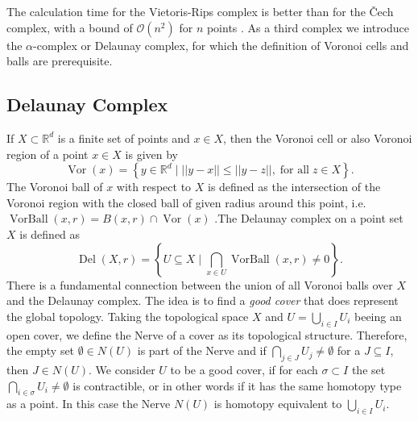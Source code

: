 \documentclass[runningheads]{llncs}
\DeclareMathOperator{\VorBall}{\text{VorBall}}
\DeclareMathOperator{\Vor}{\text{Vor}}
\DeclareMathOperator{\Del}{\text{Del}}
\begin{document}
The calculation time for the Vietoris-Rips complex is better than for the \v{C}ech complex, with a bound of $\mathcal{O}(n^2)$ for $n$ points \cite{Zomorodian10}. As a third complex we introduce the $\alpha$-complex or Delaunay complex, for which the definition of Voronoi cells and balls are prerequisite.


\subsection{Delaunay Complex}
If $X \subset \mathbb{R}^d$ is a finite set of points and $x \in X$, then the Voronoi cell or also Voronoi region of a point $x \in X$ is given by
\begin{equation}
\label{voronoicell}
\Vor(x) = \left\{ y \in \mathbb{R}^d \; \bigg\vert \; ||y-x|| \leq ||y-z||, \; \text{for all} \; z \in X \right\}.
\end{equation}
The Voronoi ball of $x$ with respect to $X$ is defined as the intersection of the Voronoi region with the closed ball of given radius around this point, i.e.   $\VorBall(x,r) = B(x,r) \cap \Vor(x)$ \cite{bauer2017morse}.The Delaunay complex on a point set $X$ is defined as
\begin{equation}
\label{delaunay}
  \Del(X,r) = \left\{ U \subseteq X \; \bigg\rvert \; \bigcap_{x\in U} \VorBall(x,r) \neq 0 \right\}.
\end{equation}
There is a fundamental connection between the union of all Voronoi balls over $X$ and the Delaunay complex. The idea is to find a \textit{good cover} that does represent the global topology. Taking the topological space $X$ and $U = \bigcup_{i \in I} U_i$ beeing an open cover, we define the Nerve of a cover as its topological structure. Therefore, the empty set $\emptyset \in N(U)$ is part of the Nerve and if $\bigcap_{j\in J} U_j \neq \emptyset$ for a $J \subseteq I$, then $J \in N(U)$. We consider $U$ to be a good cover, if for each $\sigma \subset I$ the set $\bigcap_{i\in \sigma} U_i \neq \emptyset$ is contractible, or in other words if it has the same homotopy type as a point. In this case the Nerve $N(U)$ is homotopy equivalent to $\bigcup_{i \in I} U_i$.
\end{document}
